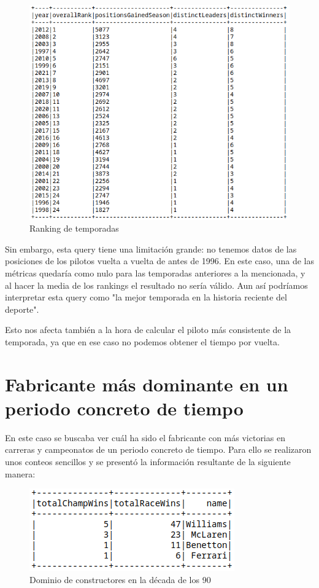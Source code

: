 \documentclass[12pt,twoside,titlepage]{report}
\begin{document}
\begin{figure}[H]
	\includegraphics[scale=0.4]{results/bestseason/bestseasonstats.png}
	\centering
	\caption{Ranking de temporadas}
	\label{fig:bestseason}
	\centering
\end{figure}

Sin embargo, esta query tiene una limitación grande: no tenemos datos de las posiciones de los pilotos vuelta a vuelta de antes de 1996. En este caso, una de las métricas quedaría como nulo para las temporadas anteriores a la mencionada, y al hacer la media de los rankings el resultado no sería válido. Aun así podríamos interpretar esta query como "la mejor temporada en la historia reciente del deporte".

Esto nos afecta también a la hora de calcular el piloto más consistente de la temporada, ya que en ese caso no podemos obtener el tiempo por vuelta.

\section{Fabricante más dominante en un periodo concreto de tiempo}

En este caso se buscaba ver cuál ha sido el fabricante con más victorias en carreras y campeonatos de un periodo concreto de tiempo. Para ello se realizaron unos conteos sencillos y se presentó la información resultante de la siguiente manera:

\begin{figure}[H]
	\includegraphics[scale=0.4]{results/constructordominance/90sconstructordominance.png}
	\centering
	\caption{Dominio de constructores en la década de los 90}
	\label{fig:constdominance}
	\centering
\end{figure}
\end{document}
